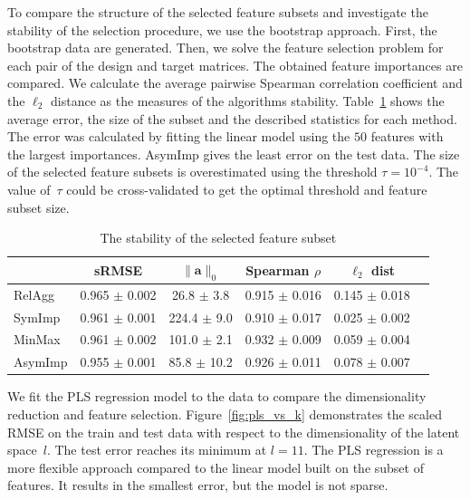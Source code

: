\documentclass[preprint,12pt]{elsarticle}
\theoremstyle{definition}
\newcommand{\ba}{\mathbf{a}}
\begin{document}
To compare the structure of the selected feature subsets and investigate the stability of the selection procedure, we use the bootstrap approach. 
First, the bootstrap data are generated. 
Then, we solve the feature selection problem for each pair of the design and target matrices.
The obtained feature importances are compared. 
We calculate the average pairwise Spearman correlation coefficient and the $\ell_2$ distance as the measures of the algorithms stability.
Table~\ref{tbl:stability} shows the average error, the size of the subset and the described statistics for each method. The error was calculated by fitting the linear model using the $50$ features with the largest importances.
AsymImp gives the least error on the test data. 
The size of the selected feature subsets is overestimated using the threshold $\tau=10^{-4}$. 
The value of~$\tau$ could be cross-validated to get the optimal threshold and feature subset size. 

\begin{table}[]
	\caption{The stability of the selected feature subset}
	\centering
	\begin{tabular}{l|ccccc}
		\hline
		& sRMSE  & $\|\ba\|_0$ & Spearman $\rho$ & $\ell_2$ dist \\ \hline
		RelAgg & 0.965 $\pm$ 0.002 & 26.8 $\pm$ 3.8 & 0.915 $\pm$ 0.016 & 0.145 $\pm$ 0.018   \\
		SymImp & 0.961 $\pm$ 0.001 & 224.4 $\pm$ 9.0 & 0.910 $\pm$ 0.017 & 0.025 $\pm$ 0.002   \\
		MinMax & 0.961 $\pm$ 0.002 & 101.0 $\pm$ 2.1& 0.932 $\pm$ 0.009 & 0.059 $\pm$ 0.004   \\
		AsymImp & 0.955 $\pm$ 0.001 & 85.8 $\pm$ 10.2& 0.926 $\pm$ 0.011 & 0.078 $\pm$ 0.007  \\ \hline
	\end{tabular}
	\label{tbl:stability}
\end{table}

We fit the PLS regression model to the data to compare the dimensionality reduction and feature selection. 
Figure~\ref{fig:pls_vs_k} demonstrates the scaled RMSE on the train and test data with respect to the dimensionality of the latent space~$l$.
The test error reaches its minimum at $l = 11$.
The PLS regression is a more flexible approach compared to the linear model built on the subset of features.
It results in the smallest error, but the model is not sparse.
\end{document}
